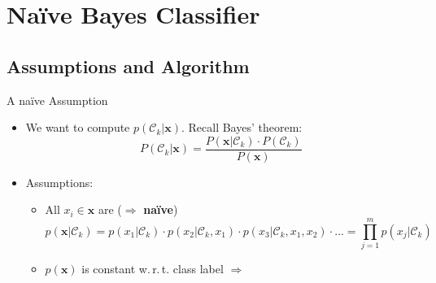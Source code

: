\section{Na\"{i}ve Bayes Classifier}

\subsection{Assumptions and Algorithm}

\begin{frame}{A na\"{i}ve Assumption}{}
	\begin{itemize}
		\item We want to compute $p(\mathcal{C}_k \vert \bm{x})$. Recall Bayes' theorem:
		\begin{equation}
			P(\mathcal{C}_k \vert \bm{x}) = \frac{P(\bm{x} \vert \mathcal{C}_k) \cdot P(\mathcal{C}_k)}{P(\bm{x})}
		\end{equation}
		\item Assumptions:
		\begin{itemize}
			\item All $x_i \in \bm{x}$ are 
				($\Rightarrow$ \textbf{na\"{i}ve})
			\begin{equation}
				p(\bm{x} \vert \mathcal{C}_k) 
					= p(x_1 \vert \mathcal{C}_k) \cdot p(x_2 \vert \mathcal{C}_k, x_1) \cdot
						p(x_3 \vert \mathcal{C}_k, x_1, x_2) \cdot ... 
					= \prod_{j=1}^m p(x_j \vert \mathcal{C}_k)
			\end{equation}
			\item $p(\bm{x})$ is constant w.\,r.\,t. class label
				$\Rightarrow$ 
		\end{itemize}
	\end{itemize}
\end{frame}


